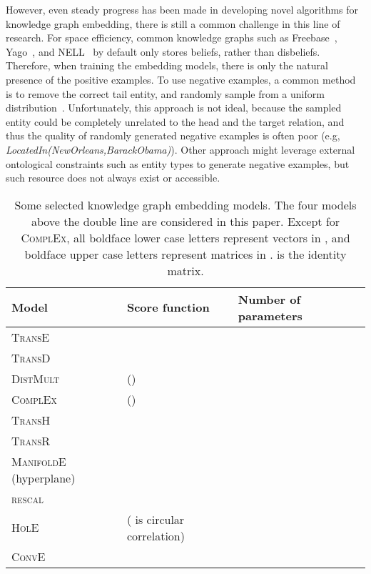 \documentclass[11pt,a4paper]{article}
\begin{document}
However, even steady progress has been made in developing novel algorithms for knowledge graph embedding, there is still a common challenge in this line of research. For space efficiency, common knowledge graphs such as Freebase~\cite{bollacker2008freebase}, Yago~\cite{suchanek2007yago}, and NELL~\cite{mitchell2015never} by default only stores beliefs, rather than disbeliefs. Therefore, when training the embedding models, there is only the natural presence of the positive examples. To use negative examples, a common method is to remove the correct tail entity, and randomly sample from a uniform distribution~\cite{bordes2013translating}. Unfortunately, this approach is not ideal, because the sampled entity could be completely unrelated to the head and the target relation, and thus the quality of randomly generated negative examples is often poor (e.g, \emph{LocatedIn(NewOrleans,BarackObama)}). Other approach might leverage external ontological constraints such as entity types \cite{krompass2015type} to generate negative examples, but such resource does not always exist or accessible.

\begin{table*}[t]
\centering
\small
\begin{tabular}{|l|l|l|l|}
\hline
\textbf{Model} & \textbf{Score function } & \textbf{Number of parameters} \\ \hline
\textsc{TransE} &  &  \\ \hline
\textsc{TransD} &  &  \\ \hline
\textsc{DistMult} &  () &  \\ \hline
\textsc{ComplEx} &  () &  \\ \hline\hline
\textsc{TransH} &  &  \\ \hline
\textsc{TransR} &  &  \\ \hline
\textsc{ManifoldE} (hyperplane) &  &  \\ \hline
\textsc{rescal} &  &  \\ \hline
\textsc{HolE} &  ( is circular correlation) &  \\ \hline
\textsc{ConvE} &  &  \\ \hline
\end{tabular}
\caption{Some selected knowledge graph embedding models. The four models above the double line are considered in this
paper. Except for \textsc{ComplEx}, all boldface lower case letters represent vectors in , and boldface upper case letters represent matrices in .  is the identity matrix.}
\label{tab:models}
\end{table*}
\end{document}
